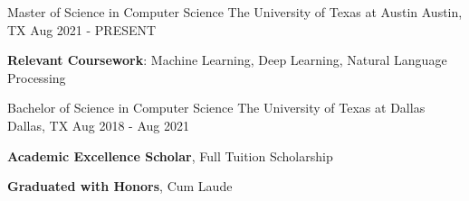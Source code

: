 
\begin{cventries}
  \cventry
    {Master of Science in Computer Science} %
    {The University of Texas at Austin} %
    {Austin, TX} %
    {Aug 2021 - PRESENT} %
    {
      \begin{cvitems} %
         \item {\textbf{Relevant Coursework}: Machine Learning, Deep Learning, Natural Language Processing}
      \end{cvitems}
    }
\end{cventries}

\begin{cventries}
  \cventry
    {Bachelor of Science in Computer Science} %
    {The University of Texas at Dallas} %
    {Dallas, TX} %
    {Aug 2018 - Aug 2021} %
    {
      \begin{cvitems} %
         \item {\textbf{Academic Excellence Scholar}, Full Tuition Scholarship}
         \vspace{0.5mm}
         \item {\textbf{Graduated with Honors}, Cum Laude}
      \end{cvitems}
    }
\end{cventries}
